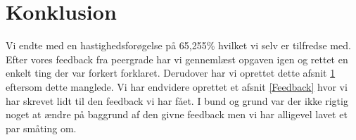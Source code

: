 \documentclass[class=report, crop=false]{standalone}
\begin{document}
    \section{Konklusion}
    \label{Konklusion}
    Vi endte med en hastighedsforøgelse på 65,255\% hvilket vi selv er tilfredse med. Efter vores feedback fra peergrade har vi gennemlæst opgaven igen og rettet en enkelt ting der var forkert forklaret.
    Derudover har vi oprettet dette afsnit \ref{Konklusion} eftersom dette manglede. Vi har endvidere oprettet et afsnit \ref{Feedback} hvor vi har skrevet lidt til den feedback vi har fået. I bund og grund var der ikke rigtig noget at ændre på baggrund af den givne feedback men vi har alligevel lavet et par småting om.
\end{document}
